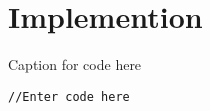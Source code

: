 \chapter{Implemention}
	\begin{listing}[H]
		\caption{Caption for code here}
		\label{listing:kernels}
		\begin{verbatim}
//Enter code here
		\end{verbatim}
	\end{listing}